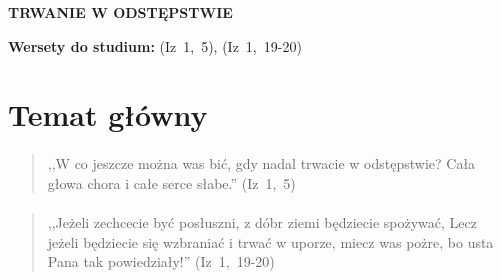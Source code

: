 \documentclass[10pt,a4paper,oneside]{article}
\begin{document}
\centerline{\textbf{\MakeUppercase{Trwanie w odstępstwie}}}
\begin{center}
\textbf{Wersety do studium:} 
\mbox{(Iz 1, 5)}, \mbox{(Iz 1, 19-20)}
\end{center}
\section{Temat główny}
\paragraph{}
\begin{quote}
,,W co jeszcze można was bić, gdy nadal trwacie w odstępstwie? Cała głowa chora i całe serce słabe.'' \mbox{(Iz 1, 5)}
\end{quote}
\paragraph{}
\begin{quote}
,,Jeżeli zechcecie być posłuszni, z dóbr ziemi będziecie spożywać, Lecz jeżeli będziecie się wzbraniać i trwać w uporze, miecz was pożre, bo usta Pana tak powiedziały!'' \mbox{(Iz 1, 19-20)}
\end{quote}
\end{document}
